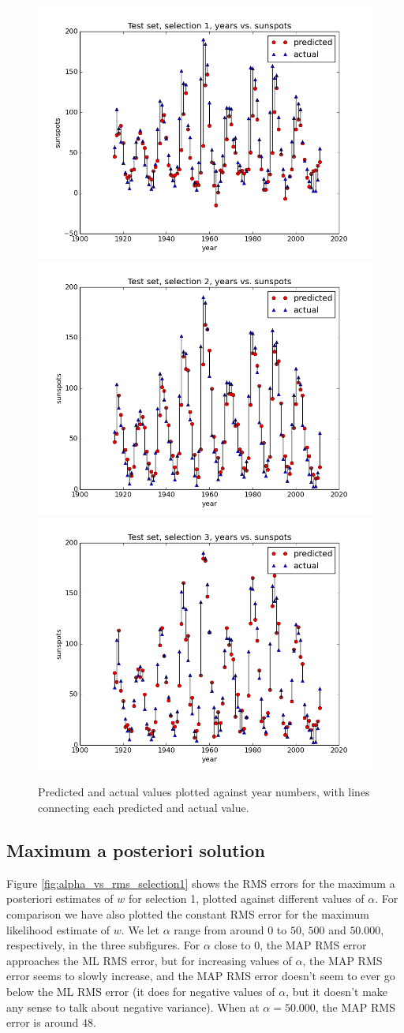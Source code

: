 \documentclass[a4paper]{article}
\begin{document}
\begin{figure}[H]
  \begin{adjustwidth}{-7em}{-7em}
    \centering
    \includegraphics[width=.32\linewidth]{figures/years_vs_sunspots_selection1.png}
    \includegraphics[width=.32\linewidth]{figures/years_vs_sunspots_selection2.png}
    \includegraphics[width=.32\linewidth]{figures/years_vs_sunspots_selection3.png}
  \end{adjustwidth}
  \caption{Predicted and actual values plotted against year numbers, with lines connecting each predicted and actual value.}
  \label{fig:years_vs_sunspots}
\end{figure}

\subsection{Maximum a posteriori solution}
Figure \ref{fig:alpha_vs_rms_selection1} shows the RMS errors for the maximum a posteriori estimates of $w$ for selection 1, plotted against different values of $\alpha$. For comparison we have also plotted the constant RMS error for the maximum likelihood estimate of $w$. We let $\alpha$ range from around $0$ to $50$, $500$ and $50.000$, respectively, in the three subfigures. For $\alpha$ close to $0$, the MAP RMS error approaches the ML RMS error, but for increasing values of $\alpha$, the MAP RMS error seems to slowly increase, and the MAP RMS error doesn't seem to ever go below the ML RMS error (it does for negative values of $\alpha$, but it doesn't make any sense to talk about negative variance). When at $\alpha = 50.000$, the MAP RMS error is around $48$.
\end{document}
